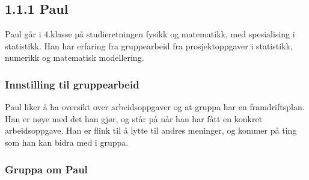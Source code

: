 \documentclass[11pt, a4paper,english]{article}
\begin{document}
\subsection{1.1.1 Paul}

Paul går i 4.klasse på studieretningen fysikk og matematikk, med spesialising i statistikk. Han har erfaring fra gruppearbeid fra prosjektoppgaver i statistikk, numerikk og matematisk modellering.

\subsubsection{Innstilling til gruppearbeid}

Paul liker å ha oversikt over arbeidsoppgaver og at gruppa har en framdriftsplan. Han er nøye med det han gjør, og står på når han har fått en konkret arbeidsoppgave. Han er flink til å lytte til andres meninger, og kommer på ting som han kan bidra med i gruppa.


\subsubsection{Gruppa om Paul}
\end{document}
